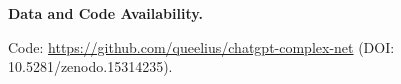 \documentclass{svproc}
\begin{document}
\smallskip\noindent\textbf{Data and Code Availability.}
\begin{sloppypar}\noindent
Code: \url{https://github.com/queelius/chatgpt-complex-net}
(DOI: 10.5281/zenodo.15314235).
\end{sloppypar}



\end{document}
